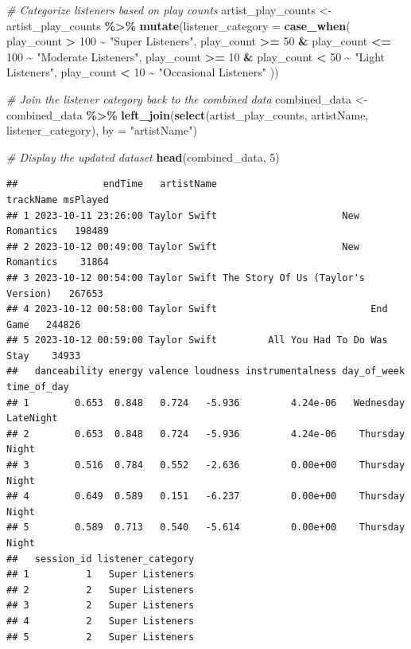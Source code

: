 \documentclass[
]{article}
\newenvironment{Shaded}{\begin{snugshade}}{\end{snugshade}}
\newcommand{\AttributeTok}[1]{\textcolor[rgb]{0.13,0.29,0.53}{#1}}
\newcommand{\CommentTok}[1]{\textcolor[rgb]{0.56,0.35,0.01}{\textit{#1}}}
\newcommand{\DecValTok}[1]{\textcolor[rgb]{0.00,0.00,0.81}{#1}}
\newcommand{\FunctionTok}[1]{\textcolor[rgb]{0.13,0.29,0.53}{\textbf{#1}}}
\newcommand{\NormalTok}[1]{#1}
\newcommand{\OtherTok}[1]{\textcolor[rgb]{0.56,0.35,0.01}{#1}}
\newcommand{\SpecialCharTok}[1]{\textcolor[rgb]{0.81,0.36,0.00}{\textbf{#1}}}
\newcommand{\StringTok}[1]{\textcolor[rgb]{0.31,0.60,0.02}{#1}}
\begin{document}
\begin{Shaded}
\begin{Highlighting}[]
\CommentTok{\# Categorize listeners based on play counts}
\NormalTok{artist\_play\_counts }\OtherTok{\textless{}{-}}\NormalTok{ artist\_play\_counts }\SpecialCharTok{\%\textgreater{}\%}
  \FunctionTok{mutate}\NormalTok{(}\AttributeTok{listener\_category =} \FunctionTok{case\_when}\NormalTok{(}
\NormalTok{    play\_count }\SpecialCharTok{\textgreater{}} \DecValTok{100} \SpecialCharTok{\textasciitilde{}} \StringTok{"Super Listeners"}\NormalTok{,}
\NormalTok{    play\_count }\SpecialCharTok{\textgreater{}=} \DecValTok{50} \SpecialCharTok{\&}\NormalTok{ play\_count }\SpecialCharTok{\textless{}=} \DecValTok{100} \SpecialCharTok{\textasciitilde{}} \StringTok{"Moderate Listeners"}\NormalTok{,}
\NormalTok{    play\_count }\SpecialCharTok{\textgreater{}=} \DecValTok{10} \SpecialCharTok{\&}\NormalTok{ play\_count }\SpecialCharTok{\textless{}} \DecValTok{50} \SpecialCharTok{\textasciitilde{}} \StringTok{"Light Listeners"}\NormalTok{,}
\NormalTok{    play\_count }\SpecialCharTok{\textless{}} \DecValTok{10} \SpecialCharTok{\textasciitilde{}} \StringTok{"Occasional Listeners"}
\NormalTok{  ))}

\CommentTok{\# Join the listener category back to the combined data}
\NormalTok{combined\_data }\OtherTok{\textless{}{-}}\NormalTok{ combined\_data }\SpecialCharTok{\%\textgreater{}\%}
  \FunctionTok{left\_join}\NormalTok{(}\FunctionTok{select}\NormalTok{(artist\_play\_counts, artistName, listener\_category), }\AttributeTok{by =} \StringTok{"artistName"}\NormalTok{)}

\CommentTok{\# Display the updated dataset}
\FunctionTok{head}\NormalTok{(combined\_data, }\DecValTok{5}\NormalTok{)}
\end{Highlighting}
\end{Shaded}

\begin{verbatim}
##               endTime   artistName                          trackName msPlayed
## 1 2023-10-11 23:26:00 Taylor Swift                      New Romantics   198489
## 2 2023-10-12 00:49:00 Taylor Swift                      New Romantics    31864
## 3 2023-10-12 00:54:00 Taylor Swift The Story Of Us (Taylor's Version)   267653
## 4 2023-10-12 00:58:00 Taylor Swift                           End Game   244826
## 5 2023-10-12 00:59:00 Taylor Swift         All You Had To Do Was Stay    34933
##   danceability energy valence loudness instrumentalness day_of_week time_of_day
## 1        0.653  0.848   0.724   -5.936         4.24e-06   Wednesday   LateNight
## 2        0.653  0.848   0.724   -5.936         4.24e-06    Thursday       Night
## 3        0.516  0.784   0.552   -2.636         0.00e+00    Thursday       Night
## 4        0.649  0.589   0.151   -6.237         0.00e+00    Thursday       Night
## 5        0.589  0.713   0.540   -5.614         0.00e+00    Thursday       Night
##   session_id listener_category
## 1          1   Super Listeners
## 2          2   Super Listeners
## 3          2   Super Listeners
## 4          2   Super Listeners
## 5          2   Super Listeners
\end{verbatim}
\end{document}
